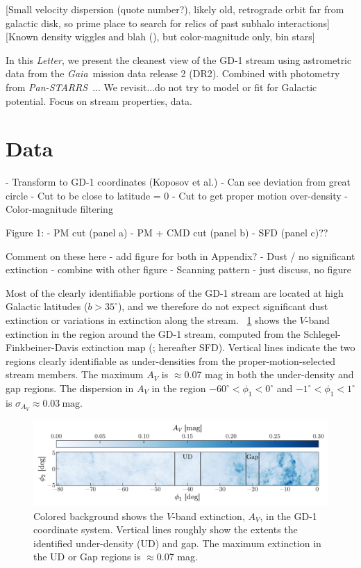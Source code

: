 \documentclass[modern]{aastex62}
\newcommand{\acronym}[1]{{\small{#1}}}
\newcommand{\gaia}{\textsl{Gaia}}
\newcommand{\pans}{\textsl{Pan-STARRS}}
\newcommand{\DR}{\acronym{DR2}}
\newcommand{\article}{\textsl{Letter}}
\begin{document}
[Small velocity dispersion (quote number?), likely old, retrograde orbit far
from galactic disk, so prime place to search for relics of past subhalo
interactions]
[Known density wiggles and blah (\citealt{DeBoer:2017}), but color-magnitude only, bin stars]

In this \article, we present the cleanest view of the GD-1 stream using
astrometric data from the \gaia\ mission data release 2 (\DR).
Combined with photometry from \pans\ ...
We revisit...do not try to model or fit for Galactic potential. Focus on stream properties, data.

\section{Data}
\label{sec:data}

- Transform to GD-1 coordinates (Koposov et al.)
    - Can see deviation from great circle
- Cut to be close to latitude = 0
- Cut to get proper motion over-density
- Color-magnitude filtering

Figure 1:
- PM cut (panel a)
- PM + CMD cut (panel b)
- SFD (panel c)??

Comment on these here - add figure for both in Appendix?
- Dust / no significant extinction - combine with other figure
- Scanning pattern - just discuss, no figure

Most of the clearly identifiable portions of the GD-1 stream are located at high
Galactic latitudes ($b > 35^\circ$), and we therefore do not expect significant
dust extinction or variations in extinction along the stream.
\figurename~\ref{fig:sfd} shows the $V$-band extinction in the region around the
GD-1 stream, computed from the Schlegel-Finkbeiner-Davis extinction map
(\cite{Schlegel:1998}; hereafter SFD).
Vertical lines indicate the two regions clearly identifiable as under-densities
from the proper-motion-selected stream members.
The maximum $A_V$ is $\approx$0.07 mag in both the under-density and gap
regions.
The dispersion in $A_V$ in the region $-60^\circ < \phi_1 < 0^\circ$ and
$-1^\circ < \phi_1 < 1^\circ$ is $\sigma_{A_V} \approx 0.03~\textrm{mag}$.

\begin{figure}[h]
\begin{center}
\includegraphics[width=\textwidth]{sfd.pdf}
\end{center}
\caption{%
Colored background shows the $V$-band extinction, $A_V$, in the GD-1
coordinate system.
Vertical lines roughly show the extents the identified under-density (UD) and
gap.
The maximum extinction in the UD or Gap regions is $\approx$0.07 mag.
\label{fig:sfd}
}
\end{figure}
\end{document}
